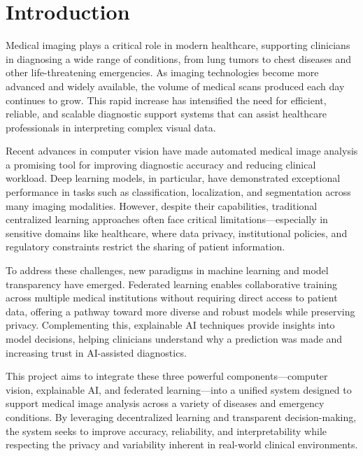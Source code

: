\newpage
\pagestyle{default}
\chapter{Introduction}
\thispagestyle{default}
Medical imaging plays a critical role in modern healthcare, supporting clinicians in diagnosing a wide range of conditions, from lung tumors to chest diseases and other life-threatening emergencies. As imaging technologies become more advanced and widely available, the volume of medical scans produced each day continues to grow. This rapid increase has intensified the need for efficient, reliable, and scalable diagnostic support systems that can assist healthcare professionals in interpreting complex visual data. \par

Recent advances in computer vision have made automated medical image analysis a promising tool for improving diagnostic accuracy and reducing clinical workload. Deep learning models, in particular, have demonstrated exceptional performance in tasks such as classification, localization, and segmentation across many imaging modalities. However, despite their capabilities, traditional centralized learning approaches often face critical limitations—especially in sensitive domains like healthcare, where data privacy, institutional policies, and regulatory constraints restrict the sharing of patient information. \par

To address these challenges, new paradigms in machine learning and model transparency have emerged. Federated learning enables collaborative training across multiple medical institutions without requiring direct access to patient data, offering a pathway toward more diverse and robust models while preserving privacy. Complementing this, explainable AI techniques provide insights into model decisions, helping clinicians understand why a prediction was made and increasing trust in AI-assisted diagnostics. \par

This project aims to integrate these three powerful components—computer vision, explainable AI, and federated learning—into a unified system designed to support medical image analysis across a variety of diseases and emergency conditions. By leveraging decentralized learning and transparent decision-making, the system seeks to improve accuracy, reliability, and interpretability while respecting the privacy and variability inherent in real-world clinical environments. \par

